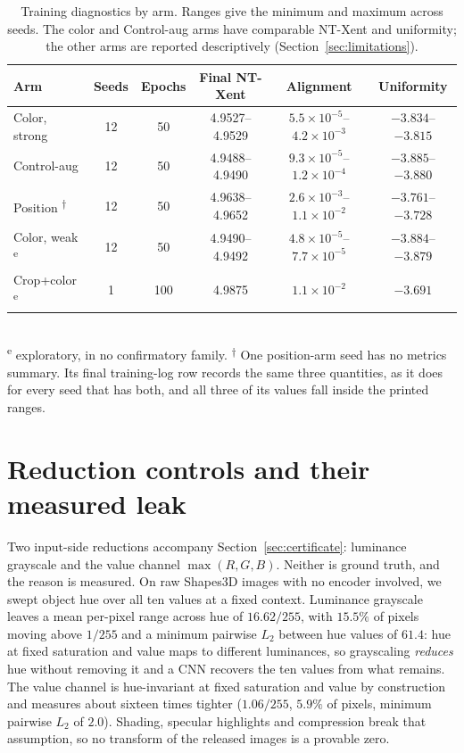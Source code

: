 \documentclass[10pt]{article}
\begin{document}
\begin{table}[t]
\centering
\caption{Training diagnostics by arm. Ranges give the minimum and maximum across seeds. The color
and Control-aug arms have comparable NT-Xent and uniformity; the other arms are reported
descriptively (Section~\ref{sec:limitations}).}
\label{tab:training}
\small
\begin{tabular}{l c c c c c}
\toprule
Arm & Seeds & Epochs & Final NT-Xent & Alignment & Uniformity \\
\midrule
Color, strong & 12 & 50 & 4.9527--4.9529 & $5.5\times10^{-5}$--$4.2\times10^{-3}$ & $-3.834$--$-3.815$ \\
Control-aug & 12 & 50 & 4.9488--4.9490 & $9.3\times10^{-5}$--$1.2\times10^{-4}$ & $-3.885$--$-3.880$ \\
Position \textsuperscript{$\dagger$} & 12 & 50 & 4.9638--4.9652 & $2.6\times10^{-3}$--$1.1\times10^{-2}$ & $-3.761$--$-3.728$ \\
Color, weak \textsuperscript{e} & 12 & 50 & 4.9490--4.9492 & $4.8\times10^{-5}$--$7.7\times10^{-5}$ & $-3.884$--$-3.879$ \\
Crop+color \textsuperscript{e} & 1 & 100 & 4.9875 & $1.1\times10^{-2}$ & $-3.691$ \\
\bottomrule
\end{tabular}
\\[2pt]
{\footnotesize \textsuperscript{e} exploratory, in no confirmatory family.
\textsuperscript{$\dagger$} One position-arm seed has no metrics summary. Its final training-log
row records the same three quantities, as it does for every seed that has both, and all three of its
values fall inside the printed ranges.}
\end{table}

\section{Reduction controls and their measured leak}
\label{app:reduction}
Two input-side reductions accompany Section~\ref{sec:certificate}: luminance
grayscale and the value channel $\max(R,G,B)$. Neither is ground truth, and the reason is measured.
On raw Shapes3D images with no encoder involved, we swept object hue over all
ten values at a fixed context. Luminance grayscale leaves a mean per-pixel range across hue of
$16.62/255$, with $15.5\%$ of pixels moving above $1/255$ and a minimum pairwise $L_2$ between hue
values of $61.4$: hue at fixed saturation and value maps to different luminances, so grayscaling
\emph{reduces} hue without removing it and a CNN recovers the ten values from what remains. The
value channel is hue-invariant at fixed saturation and value by construction and measures about
sixteen times tighter ($1.06/255$, $5.9\%$ of pixels, minimum pairwise $L_2$ of $2.0$). Shading,
specular highlights and compression break that assumption, so no
transform of the released images is a provable zero.
\end{document}
